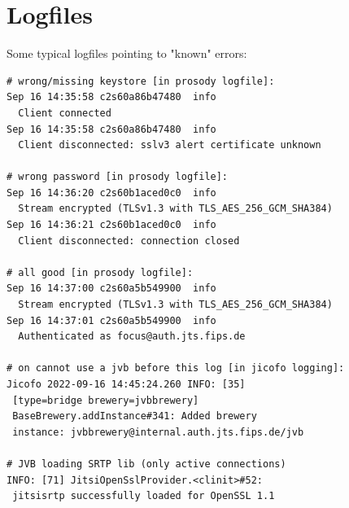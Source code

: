 \documentclass[10pt,conference]{IEEEtran}
\begin{document}
\section{Logfiles}
Some typical logfiles pointing to "known" errors:
\begin{verbatim}
# wrong/missing keystore [in prosody logfile]:
Sep 16 14:35:58 c2s60a86b47480  info
  Client connected
Sep 16 14:35:58 c2s60a86b47480  info
  Client disconnected: sslv3 alert certificate unknown

# wrong password [in prosody logfile]:
Sep 16 14:36:20 c2s60b1aced0c0  info
  Stream encrypted (TLSv1.3 with TLS_AES_256_GCM_SHA384)
Sep 16 14:36:21 c2s60b1aced0c0  info
  Client disconnected: connection closed

# all good [in prosody logfile]:
Sep 16 14:37:00 c2s60a5b549900  info
  Stream encrypted (TLSv1.3 with TLS_AES_256_GCM_SHA384)
Sep 16 14:37:01 c2s60a5b549900  info
  Authenticated as focus@auth.jts.fips.de

# on cannot use a jvb before this log [in jicofo logging]:
Jicofo 2022-09-16 14:45:24.260 INFO: [35]
 [type=bridge brewery=jvbbrewery]
 BaseBrewery.addInstance#341: Added brewery
 instance: jvbbrewery@internal.auth.jts.fips.de/jvb

# JVB loading SRTP lib (only active connections)
INFO: [71] JitsiOpenSslProvider.<clinit>#52:
 jitsisrtp successfully loaded for OpenSSL 1.1
\end{verbatim}
\end{document}
